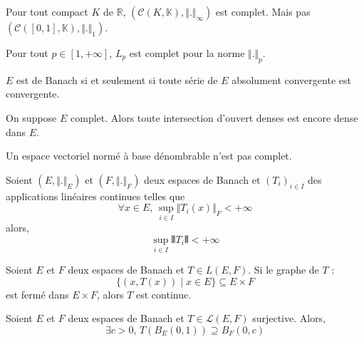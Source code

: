 	\begin{example}
		Pour tout compact $K$ de $\mathbb{R}$, $(\mathcal{C}(K, \mathbb{K}), \Vert . \Vert_\infty)$ est complet. Mais pas $(\mathcal{C}([0,1], \mathbb{K}), \Vert . \Vert_1)$.
	\end{example}

	\begin{theorem}
  	Pour tout $p \in [1, +\infty]$, $L_p$ est complet pour la norme $\Vert . \Vert_p$.
  \end{theorem}


	\begin{proposition}
		$E$ est de Banach si et seulement si toute série de $E$ absolument convergente est convergente.
	\end{proposition}


	\begin{theorem}[Baire]
		On suppose $E$ complet. Alors toute intersection d'ouvert denses est encore dense dans $E$.
	\end{theorem}


	\begin{application}
		Un espace vectoriel normé à base dénombrable n'est pas complet.
	\end{application}


	\begin{application}
		Soient $(E, \Vert . \Vert_E)$ et $(F, \Vert . \Vert_F)$ deux espaces de Banach et $(T_i)_{i \in I}$ des applications linéaires continues telles que
		\[ \forall x \in E, \, \sup_{i \in I} \Vert T_i(x) \Vert_F < +\infty \]
		alors,
		\[ \sup_{i \in I} \VERT T_i \VERT < +\infty \]
	\end{application}

	\begin{application}
		Soient $E$ et $F$ deux espaces de Banach et $T \in L(E,F)$. Si le graphe de $T$ :
		\[ \{ (x, T(x)) \mid x \in E \} \subseteq E \times F \]
		est fermé dans $E \times F$, alors $T$ est continue.
	\end{application}

		\begin{application}
		Soient $E$ et $F$ deux espaces de Banach et $T \in \mathcal{L}(E,F)$ surjective. Alors,
		\[ \exists c > 0, \, T\left(B_E(0,1)\right) \supseteq B_F(0,c) \]
	\end{application}

